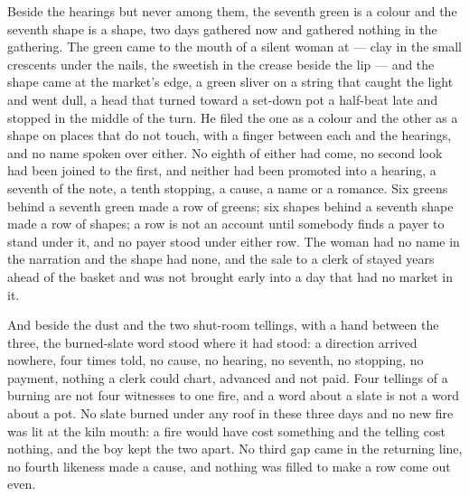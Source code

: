 Beside the hearings but never among them, the seventh green is a colour and the seventh shape is a shape, two days gathered now and gathered nothing in the gathering. The green came to the mouth of a silent woman at  --- clay in the small crescents under the nails, the sweetish  in the crease beside the lip --- and the shape came at the market's edge, a green sliver on a string that caught the light and went dull, a head that turned toward a set-down pot a half-beat late and stopped in the middle of the turn. He filed the one as a colour and the other as a shape on places that do not touch, with a finger between each and the hearings, and no name spoken over either. No eighth of either had come, no second look had been joined to the first, and neither had been promoted into a hearing, a seventh of the note, a tenth stopping, a cause, a name or a romance. Six greens behind a seventh green made a row of greens; six shapes behind a seventh shape made a row of shapes; a row is not an account until somebody finds a payer to stand under it, and no payer stood under either row. The woman had no name in the narration and the shape had none, and the sale to a clerk of  stayed years ahead of the basket and was not brought early into a day that had no market in it.

And beside the dust and the two shut-room tellings, with a hand between the three, the burned-slate word stood where it had stood: a direction arrived nowhere, four times told, no cause, no hearing, no seventh, no stopping, no payment, nothing a clerk could chart, advanced and not paid. Four tellings of a burning are not four witnesses to one fire, and a word about a slate is not a word about a pot. No slate burned under any roof in these three days and no new fire was lit at the kiln mouth: a fire would have cost something and the telling cost nothing, and the boy kept the two apart. No third gap came in the returning line, no fourth likeness made a cause, and nothing was filled to make a row come out even.


